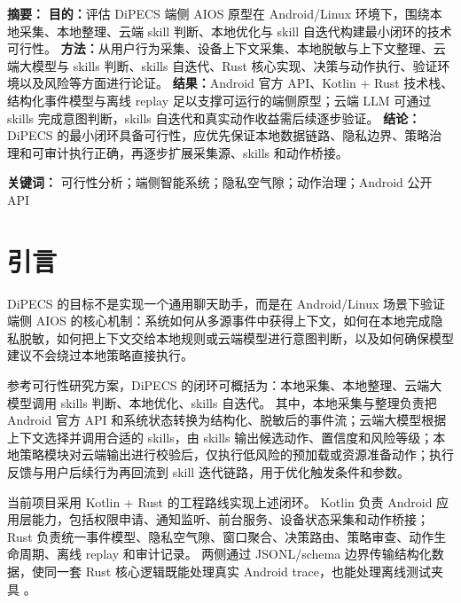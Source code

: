 \documentclass[12pt,a4paper]{article}
\begin{document}
\makecover
\clearpage
{}

{\hypersetup{linkcolor=black}\tableofcontents}
\newpage

\begin{dipecsabstract}
\noindent\textbf{ 摘要：}
\textbf{目的：}评估 DiPECS 端侧 AIOS 原型在 Android/Linux 环境下，围绕本地采集、本地整理、云端 skill 判断、本地优化与 skill 自迭代构建最小闭环的技术可行性。
\textbf{方法：}从用户行为采集、设备上下文采集、本地脱敏与上下文整理、云端大模型与 skills 判断、skills 自迭代、Rust 核心实现、决策与动作执行、验证环境以及风险等方面进行论证。
\textbf{结果：}Android 官方 API、Kotlin + Rust 技术栈、结构化事件模型与离线 replay 足以支撑可运行的端侧原型；云端 LLM 可通过 skills 完成意图判断，skills 自迭代和真实动作收益需后续逐步验证。
\textbf{结论：}DiPECS 的最小闭环具备可行性，应优先保证本地数据链路、隐私边界、策略治理和可审计执行正确，再逐步扩展采集源、skills 和动作桥接。

\vspace{0.5em}
\noindent\textbf{ 关键词：} 可行性分析；端侧智能系统；隐私空气隙；动作治理；Android 公开 API
\end{dipecsabstract}

\section{引言}\label{sec:intro}

DiPECS 的目标不是实现一个通用聊天助手，而是在 Android/Linux 场景下验证端侧 AIOS 的核心机制：系统如何从多源事件中获得上下文，如何在本地完成隐私脱敏，如何把上下文交给本地规则或云端模型进行意图判断，以及如何确保模型建议不会绕过本地策略直接执行。

参考可行性研究方案，DiPECS 的闭环可概括为：本地采集、本地整理、云端大模型调用 skills 判断、本地优化、skills 自迭代。
其中，本地采集与整理负责把 Android 官方 API 和系统状态转换为结构化、脱敏后的事件流；云端大模型根据上下文选择并调用合适的 skills，由 skills 输出候选动作、置信度和风险等级；本地策略模块对云端输出进行校验后，仅执行低风险的预加载或资源准备动作；执行反馈与用户后续行为再回流到 skill 迭代链路，用于优化触发条件和参数。

当前项目采用 Kotlin + Rust 的工程路线实现上述闭环。
Kotlin 负责 Android 应用层能力，包括权限申请、通知监听、前台服务、设备状态采集和动作桥接；Rust 负责统一事件模型、隐私空气隙、窗口聚合、决策路由、策略审查、动作生命周期、离线 replay 和审计记录。
两侧通过 JSONL/schema 边界传输结构化数据，使同一套 Rust 核心逻辑既能处理真实 Android trace，也能处理离线测试夹具 \cite{aios}。
\end{document}
